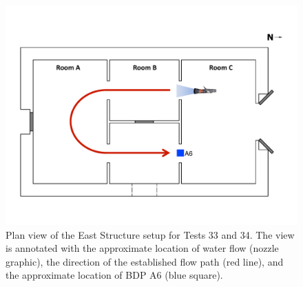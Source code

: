 \documentclass[12pt,oneside]{book}
\begin{document}
\begin{figure}[!ht]
	\includegraphics[width=\columnwidth]{../Figures/Floor_Plans/Specific_Tests/East_Hose_Test_Annotated}
	\caption[Plan view of the East Structure setup for Tests 33 and 34.]{Plan view of the East Structure setup for Tests 33 and 34. The view is annotated with the approximate location of water flow (nozzle graphic), the direction of the established flow path (red line), and the approximate location of BDP A6 (blue square).}
	\label{fig:east_setup}
\end{figure}
\end{document}
